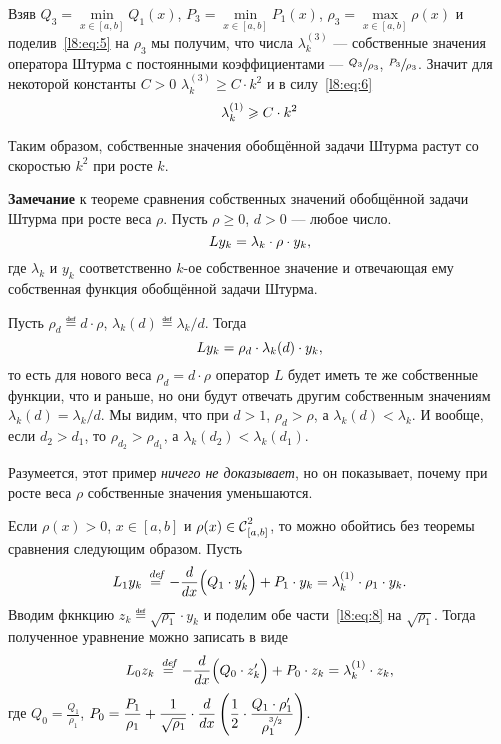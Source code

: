 Взяв $Q_3=\displaystyle\min\limits_{x\in[a,b]}Q_1(x)$, $P_3=\displaystyle\min\limits_{x\in[a,b]}P_1(x)$, $\rho_3=\displaystyle\max\limits_{x\in[a,b]}\rho(x)$ и поделив~\eqref{l8:eq:5} на $\rho_3$ мы получим, что числа $\lambda_k^{(3)}$ --- собственные значения оператора Штурма с постоянными коэффициентами --- $\sfrac{Q_3}{\rho_3}$, $\sfrac{P_3}{\rho_3}$. Значит для некоторой константы $C>0$ $\lambda_k^{(3)}\geqslant C\cdot k^2$ и в силу~\eqref{l8:eq:6} 
\begin{equation}\label{l8:eq:7}
	\hfill\lambda_k^{(1)}\geqslant C\cdot k^2\hfill
\end{equation}

Таким образом, собственные значения обобщённой задачи Штурма растут со скоростью $k^2$ при росте $k$.

\noindent\textbf{Замечание} к теореме сравнения собственных значений обобщённой задачи Штурма при росте веса $\rho$. Пусть $\rho\geqslant0$, $d>0$ --- любое число.
\begin{equation*}
	\hfill Ly_k=\lambda_k\cdot\rho\cdot y_k,\hfill
\end{equation*}
где $\lambda_k$ и $y_k$ соответственно $k$-ое собственное значение и отвечающая ему собственная функция обобщённой задачи Штурма. 

Пусть $\rho_d\eqdef d\cdot\rho$, $\lambda_k(d)\eqdef\lambda_k/d$. Тогда 
\begin{equation*}
	\hfill Ly_k=\rho_d\cdot\lambda_k(d)\cdot y_k,\hfill
\end{equation*}
то есть для нового веса $\rho_d=d\cdot\rho$ оператор $L$ будет иметь те же собственные функции, что и раньше, но они будут отвечать другим собственным значениям $\lambda_k(d)=\lambda_k/d$. Мы видим, что при $d>1$, $\rho_d>\rho$, а $\lambda_k(d)<\lambda_k$. И вообще, если $d_2>d_1$, то $\rho_{d_2}>\rho_{d_1}$, а $\lambda_k(d_2)<\lambda_k(d_1)$.

Разумеется, этот пример \emph{ничего не доказывает}, но он показывает, почему при росте веса $\rho$ собственные значения уменьшаются.

Если $\rho(x)>0$, $x\in[a,b]$ и $\rho(x)\in\Cfn[{[a,b]}]{2}$, то можно обойтись без теоремы сравнения следующим образом. Пусть
\begin{equation}\label{l8:eq:8}
	\hfill L_1y_k\eqdef-\der{}{x}\Big(Q_1\cdot y'_k\Big)+P_1\cdot y_k=\lambda_k^{(1)}\cdot\rho_1\cdot y_k.\hfill
\end{equation}
Вводим фкнкцию $z_k\eqdef\sqrt{\rho_1}\cdot y_k$ и поделим обе части~\eqref{l8:eq:8} на $\sqrt{\rho_1}$. Тогда полученное уравнение можно записать в виде
\begin{equation}\label{l8:eq:9}
	\hfill L_0z_k\eqdef-\der{}{x}\Big(Q_0\cdot z'_k\Big)+P_0\cdot z_k=\lambda_k^{(1)}\cdot z_k,\hfill
\end{equation}
где $\displaystyle Q_0=\frac{Q_1}{\rho_1}$, $\displaystyle P_0=\frac{P_1}{\rho_1}+\frac1{\sqrt{\rho_1}}\cdot\der{}{x}\left(\frac12\cdot\frac{Q_1\cdot\rho'_1}{\rho_1^{\sfrac{3}{2}}}\right)$.

